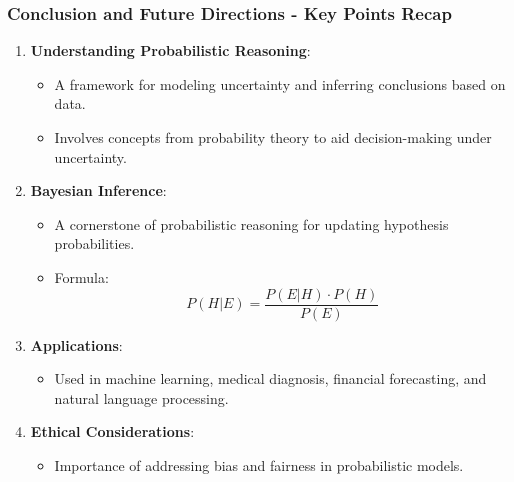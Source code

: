 \documentclass[aspectratio=169]{beamer}
\begin{document}
\begin{frame}[fragile]
  \frametitle{Conclusion and Future Directions - Key Points Recap}
  \begin{enumerate}
    \item \textbf{Understanding Probabilistic Reasoning}:
      \begin{itemize}
        \item A framework for modeling uncertainty and inferring conclusions based on data.
        \item Involves concepts from probability theory to aid decision-making under uncertainty.
      \end{itemize}
      
    \item \textbf{Bayesian Inference}:
      \begin{itemize}
        \item A cornerstone of probabilistic reasoning for updating hypothesis probabilities.
        \item Formula:
        \begin{equation}
          P(H|E) = \frac{P(E|H) \cdot P(H)}{P(E)}
        \end{equation}
      \end{itemize}

    \item \textbf{Applications}:
      \begin{itemize}
        \item Used in machine learning, medical diagnosis, financial forecasting, and natural language processing.
      \end{itemize}

    \item \textbf{Ethical Considerations}:
      \begin{itemize}
        \item Importance of addressing bias and fairness in probabilistic models.
      \end{itemize}
  \end{enumerate}
\end{frame}
\end{document}

